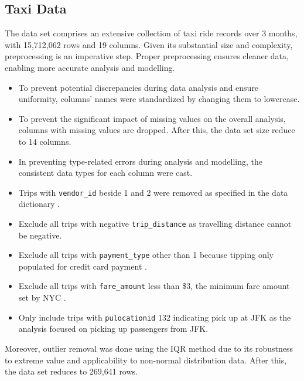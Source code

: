 \documentclass[11pt]{article}
\begin{document}
\subsection{Taxi Data}
The data set comprises an extensive collection of taxi ride records over 3 months, with 15,712,062 rows and 19 columns. Given its substantial size and complexity, preprocessing is an imperative step. Proper preprocessing ensures cleaner data, enabling more accurate analysis and modelling. 
\begin{itemize}
    \item To prevent potential discrepancies during data analysis and ensure uniformity, columns' names were standardized by changing them to lowercase. 
    \item To prevent the significant impact of missing values on the overall analysis, columns with missing values are dropped. After this, the data set size reduce to 14 columns.
    \item In preventing type-related errors during analysis and modelling, the consistent data types for each column were cast. 
    \item Trips with \texttt{vendor\_id} beside 1 and 2 were removed as specified in the data dictionary \cite{taxidatadict}. 
    \item Exclude all trips with negative \texttt{trip\_distance} as travelling distance cannot be negative.
    \item Exclude all trips with \texttt{payment\_type} other than 1 because tipping only populated for credit card payment \cite{taxidatadict}. 
    \item Exclude all trips with \texttt{fare\_amount} less than \$3, the minimum fare amount set by NYC \cite{fareamount}.
    \item Only include trips with \texttt{pulocationid} 132 indicating pick up at JFK as the analysis focused on picking up passengers from JFK. 
\end{itemize}
Moreover, outlier removal was done using the IQR method due to its robustness to extreme value and applicability to non-normal distribution data. After this, the data set reduces to 269,641 rows. 
\end{document}
